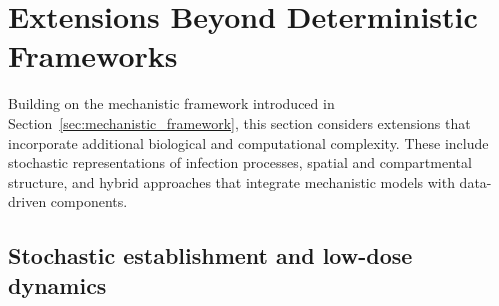 \documentclass[11pt]{article}
\begin{document}
%
%
%





\section{Extensions Beyond Deterministic Frameworks} %
\label{sec:extensions}

Building on the mechanistic framework introduced in Section~\ref{sec:mechanistic_framework}, this section considers extensions that incorporate additional biological and computational complexity. These include stochastic representations of infection processes, spatial and compartmental structure, and hybrid approaches that integrate mechanistic models with data-driven components.


\subsection{Stochastic establishment and low-dose dynamics}
\end{document}
